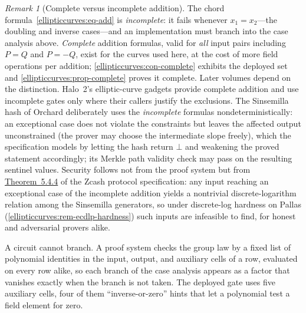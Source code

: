 \documentclass[11pt,a4paper]{article}
\theoremstyle{definition}
\theoremstyle{remark}
\newtheorem{remark}[theorem]{Remark}
\begin{document}
\begin{remark}[Complete versus incomplete addition]
\label{ellipticcurves:rem-complete}
The chord formula~\eqref{ellipticcurves:eq-add} is \emph{incomplete}:
it fails whenever \(x_1 = x_2\)---the doubling and inverse cases---and
an implementation must branch into the case analysis above.
\emph{Complete} addition formulas, valid for \emph{all} input pairs
including \(P = Q\) and \(P = -Q\), exist for the curves used here, at
the cost of more field operations per addition;
\cref{ellipticcurves:con-complete} exhibits the deployed set and
\cref{ellipticcurves:prop-complete} proves it complete. Later volumes
depend on the distinction. Halo~2's elliptic-curve gadgets provide
complete addition and use incomplete gates only where their callers
justify the exclusions. The Sinsemilla hash of Orchard deliberately uses
the \emph{incomplete} formulas nondeterministically: an exceptional case does
not violate the constraints but leaves the affected output unconstrained
(the prover may choose the intermediate slope freely), which the
specification models by letting the hash return \(\bot\) and weakening
the proved statement accordingly; its Merkle path validity check may pass
on the resulting sentinel values. Security follows not from the proof
system but from
\href{https://zips.z.cash/protocol/protocol.pdf\#thmsinsemillaex}{Theorem~5.4.4}
of the Zcash protocol specification: any input reaching an exceptional
case of the incomplete addition yields a nontrivial discrete-logarithm
relation among the Sinsemilla generators, so under discrete-log hardness
on Pallas (\cref{ellipticcurves:rem-ecdlp-hardness}) such inputs are
infeasible to find, for honest and adversarial provers alike.
\end{remark}

A circuit cannot branch. A proof system checks the group law by a fixed
list of polynomial identities in the input, output, and auxiliary cells of
a row, evaluated on every row alike, so each branch of the case analysis
appears as a factor that vanishes exactly when the branch is not taken.
The deployed gate uses five auxiliary cells, four of them
``inverse-or-zero'' hints that let a polynomial test a field element for
zero.
\end{document}
